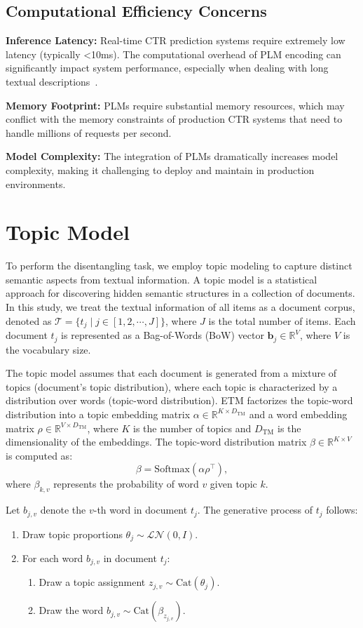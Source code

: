 \subsection{Computational Efficiency Concerns}

\textbf{Inference Latency:} Real-time CTR prediction systems require extremely low latency (typically <10ms). The computational overhead of PLM encoding can significantly impact system performance, especially when dealing with long textual descriptions~\cite{li2023ctrl}.

\textbf{Memory Footprint:} PLMs require substantial memory resources, which may conflict with the memory constraints of production CTR systems that need to handle millions of requests per second.

\textbf{Model Complexity:} The integration of PLMs dramatically increases model complexity, making it challenging to deploy and maintain in production environments.

\section{Topic Model}

To perform the disentangling task, we employ topic modeling to capture distinct semantic aspects from textual information. A topic model is a statistical approach for discovering hidden semantic structures in a collection of documents. In this study, we treat the textual information of all items as a document corpus, denoted as $\mathcal{T} = \{t_j \mid j \in [1, 2, \cdots, J]\}$, where $J$ is the total number of items. Each document $t_j$ is represented as a Bag-of-Words (BoW) vector $\mathbf{b}_j \in \mathbb{R}^{V}$, where $V$ is the vocabulary size.

The topic model assumes that each document is generated from a mixture of topics (document's topic distribution), where each topic is characterized by a distribution over words (topic-word distribution). ETM factorizes the topic-word distribution into a topic embedding matrix $\alpha \in \mathbb{R}^{K \times D_{\text{TM}}}$ and a word embedding matrix $\rho \in \mathbb{R}^{V \times D_{\text{TM}}}$, where $K$ is the number of topics and $D_{\text{TM}}$ is the dimensionality of the embeddings. The topic-word distribution matrix $\beta \in \mathbb{R}^{K \times V}$ is computed as:
\[
\beta = \text{Softmax}(\alpha \rho^\top),
\]
where $\beta_{k,v}$ represents the probability of word $v$ given topic $k$.

Let $b_{j,v}$ denote the $v$-th word in document $t_j$. The generative process of $t_j$ follows:
\begin{enumerate}
    \item Draw topic proportions $\theta_j \sim \mathcal{LN}(0, I)$.
    \item For each word $b_{j,v}$ in document $t_j$:
    \begin{enumerate}
        \item Draw a topic assignment $z_{j,v} \sim \text{Cat}(\theta_j)$.
        \item Draw the word $b_{j,v} \sim \text{Cat}(\beta_{z_{j,v}})$.
    \end{enumerate}
\end{enumerate}


